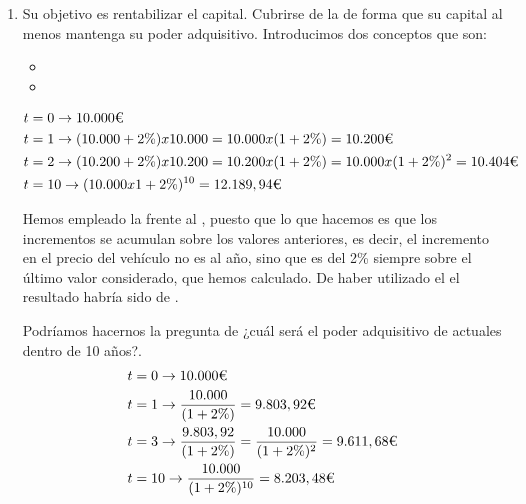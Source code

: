 \begin{enumerate}[label=\alph*)]
    \item Su objetivo es rentabilizar el capital. Cubrirse de la  de forma que su capital al menos mantenga su poder adquisitivo. Introducimos dos conceptos que son:
    \begin{itemize}
        \item {}
        \item {}
    \end{itemize}
    \begin{testexample}
        \begin{equation*}
            \begin{split}
                t &= 0 \rightarrow \euros{10.000} \\
                t &= 1 \rightarrow  (10.000 + 2\%) x 10.000 = 10.000 x (1 + 2\%) = \euros{10.200} \\
                t &= 2 \rightarrow (10.200 + 2\%) x 10.200 = 10.200 x (1+2\%) = 10.000 x (1+2\%)^2 = \euros{10.404} \\
                t &= 10 \rightarrow (10.000 x 1+2\%)^{10} = \euros{12.189,94}
            \end{split}
        \end{equation*}

        Hemos empleado la  frente al , puesto que lo que hacemos es que los incrementos se acumulan sobre los valores anteriores, es decir, el incremento en el precio del vehículo no es  al año, sino que es del 2\% siempre sobre el último valor considerado, que hemos calculado. De haber utilizado el  el resultado habría sido de .

        Podríamos hacernos la pregunta de ¿cuál será el poder adquisitivo de  actuales dentro de 10 años?.
        \begin{equation*}
            \begin{split}
                t &= 0 \rightarrow \euros{10.000} \\
                t &= 1 \rightarrow \frac{10.000}{(1+2\%)} = \euros{9.803,92} \\
                t &= 3 \rightarrow \frac{9.803,92}{(1+2\%)} = \frac{10.000}{(1+2\%)^2} = \euros{9.611,68} \\
                t &= 10 \rightarrow \frac{10.000}{(1+2\%)^{10}} = \euros{8.203,48}
            \end{split}
        \end{equation*}
    \end{testexample}


\end{enumerate}
